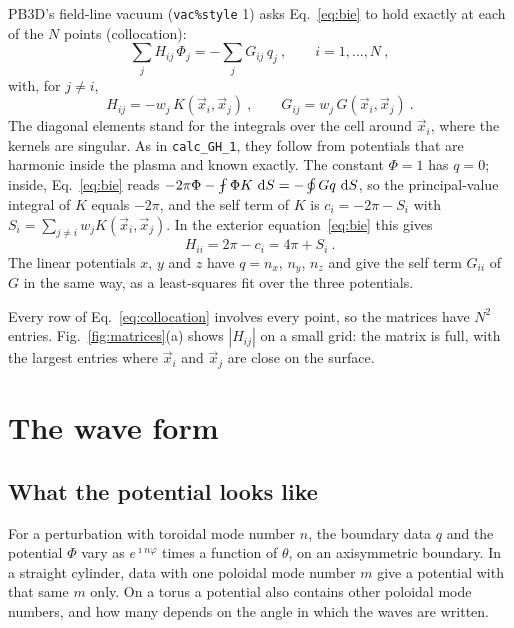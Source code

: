 \documentclass[%
 aip,
 rsi,%
 amsmath,amssymb,
 reprint,%
]{revtex4-1}
\begin{document}
PB3D's field-line vacuum (\texttt{vac\%style} 1) asks Eq.~\eqref{eq:bie} to hold exactly at each of the $N$ points (collocation):
\begin{equation}
\sum_{j} H_{ij}\,\Phi_j = -\sum_{j} G_{ij}\,q_j \ , \qquad i = 1,\ldots,N \ ,
\label{eq:collocation}
\end{equation}
with, for $j \neq i$,
\begin{equation}
H_{ij} = -w_j\,K(\vec{x}_i,\vec{x}_j) \ , \qquad G_{ij} = w_j\,G(\vec{x}_i,\vec{x}_j) \ .
\label{eq:offdiag}
\end{equation}
The diagonal elements stand for the integrals over the cell around $\vec{x}_i$, where the kernels are singular.
As in \texttt{calc\_GH\_1}, they follow from potentials that are harmonic inside the plasma and known exactly.
The constant $\Phi = 1$ has $q = 0$; inside, Eq.~\eqref{eq:bie} reads $-2\pi\Phi - \pvint\Phi K\,\d{S} = -\oint G q\,\d{S}$, so the principal-value integral of $K$ equals $-2\pi$, and the self term of $K$ is $c_i = -2\pi - S_i$ with $S_i = \sum_{j\neq i} w_j K(\vec{x}_i,\vec{x}_j)$.
In the exterior equation~\eqref{eq:bie} this gives
\begin{equation}
H_{ii} = 2\pi - c_i = 4\pi + S_i \ .
\end{equation}
The linear potentials $x$, $y$ and $z$ have $q = n_x$, $n_y$, $n_z$ and give the self term $G_{ii}$ of $G$ in the same way, as a least-squares fit over the three potentials.

Every row of Eq.~\eqref{eq:collocation} involves every point, so the matrices have $N^2$ entries.
Fig.~\ref{fig:matrices}(a) shows $|H_{ij}|$ on a small grid: the matrix is full, with the largest entries where $\vec{x}_i$ and $\vec{x}_j$ are close on the surface.

\section{The wave form}\label{sec:waves}
\subsection{What the potential looks like}
For a perturbation with toroidal mode number $n$, the boundary data $q$ and the potential $\Phi$ vary as $e^{\imath n \varphi}$ times a function of $\theta$, on an axisymmetric boundary.
In a straight cylinder, data with one poloidal mode number $m$ give a potential with that same $m$ only.
On a torus a potential also contains other poloidal mode numbers, and how many depends on the angle in which the waves are written.
\end{document}
